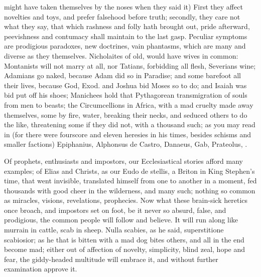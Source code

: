 {might have taken themselves by the noses when they said it) First
they affect novelties and toys, and prefer falsehood before truth;
secondly, they care not what they say, that which rashness and
folly hath brought out, pride afterward, peevishness and contumacy
shall maintain to the last gasp. Peculiar symptoms are prodigious
paradoxes, new doctrines, vain phantasms, which are many and diverse as
they themselves. Nicholaites of old, would have wives in common:
Montanists will not marry at all, nor Tatians, forbidding all flesh,
Severians wine; Adamians go naked, because Adam did so in
Paradise; and some barefoot all their lives, because God, Exod.
 and Joshua  bid Moses so to do; and Isaiah  was bid put off
his shoes; Manichees hold that Pythagorean transmigration of souls from
men to beasts; the Circumcellions in Africa, with a mad cruelty
made away themselves, some by fire, water, breaking their necks, and
seduced others to do the like, threatening some if they did not, with a
thousand such; as you may read in \Austin{} (for there were
fourscore and eleven heresies in his times, besides schisms and smaller
factions) Epiphanius, Alphonsus de Castro, Danaeus, Gab, Prateolus, \etc{}.

Of prophets, enthusiasts and impostors, our Ecclesiastical stories
afford many examples; of Elias and Christs, as our Eudo de
stellis, a Briton in King Stephen's time, that went invisible,
translated himself from one to another in a moment, fed thousands with
good cheer in the wilderness, and many such; nothing so common as
miracles, visions, revelations, prophecies. Now what these brain-sick
heretics once broach, and impostors set on foot, be it never so absurd,
false, and prodigious, the common people will follow and believe. It
will run along like murrain in cattle, scab in sheep. Nulla scabies, as
he said, superstitione scabiosior; as he that is bitten with a
mad dog bites others, and all in the end become mad; either out of
affection of novelty, simplicity, blind zeal, hope and fear, the
giddy-headed multitude will embrace it, and without further examination
approve it.

}
